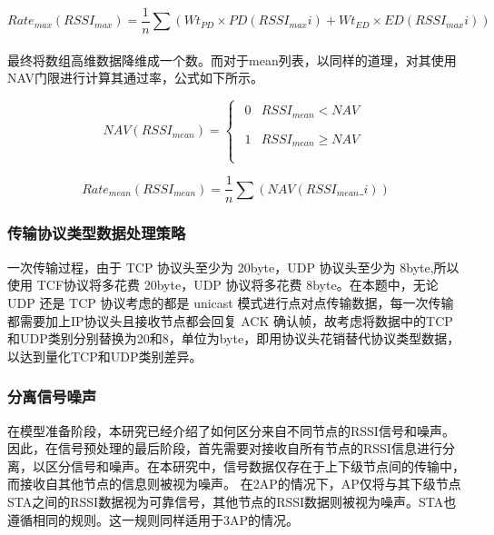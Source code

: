 \documentclass[bwprint]{gmcmthesis}
\begin{document}
\begin{equation}
	Rate_{max}\left( RSSI_{max} \right) =\frac{1}{n}\sum{\left( Wt_{PD}\times PD\left( RSSI_{max}i \right) +Wt_{ED}\times ED\left( RSSI_{max}i \right) \right)}
\end{equation}
\\
最终将数组高维数据降维成一个数。而对于mean列表，以同样的道理，对其使用NAV门限进行计算其通过率，公式如下所示。

\begin{equation}
	NAV\left( RSSI_{mean} \right) =\left\{ \begin{array}{l}
		\begin{matrix}
			0&		RSSI_{mean}<NAV\\
		\end{matrix}\\
		\begin{matrix}
			1&		RSSI_{mean}\ge NAV\\
		\end{matrix}\\
	\end{array} \right. 
\end{equation}

\begin{equation}
	Rate_{mean}\left( RSSI_{mean} \right) =\frac{1}{n}\sum{\left( NAV\left( RSSI_{mean}\_i \right) \right)}
\end{equation}

\subsubsection{传输协议类型数据处理策略}

一次传输过程，由于 TCP 协议头至少为 20byte，UDP 协议头至少为 8byte,所以使用 TCF协议将多花费 20byte，UDP 协议将多花费 8byte。在本题中，无论 UDP 还是 TCP 协议考虑的都是 unicast 模式进行点对点传输数据，每一次传输都需要加上IP协议头且接收节点都会回复 ACK 确认帧，故考虑将数据中的TCP和UDP类别分别替换为20和8，单位为byte，即用协议头花销替代协议类型数据，以达到量化TCP和UDP类别差异。

\subsubsection{分离信号噪声}

在模型准备阶段，本研究已经介绍了如何区分来自不同节点的RSSI信号和噪声。因此，在信号预处理的最后阶段，首先需要对接收自所有节点的RSSI信息进行分离，以区分信号和噪声。在本研究中，信号数据仅存在于上下级节点间的传输中，而接收自其他节点的信息则被视为噪声。
在2AP的情况下，AP仅将与其下级节点STA之间的RSSI数据视为可靠信号，其他节点的RSSI数据则被视为噪声。STA也遵循相同的规则。这一规则同样适用于3AP的情况。
\end{document}

